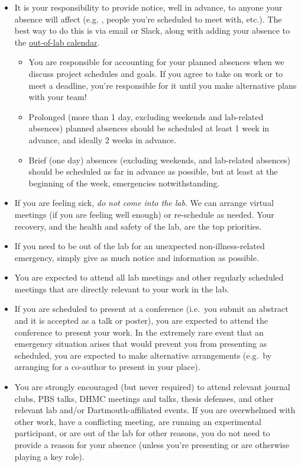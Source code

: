 \documentclass{tufte-book} %
\begin{document}
\begin{itemize}
\item It is your responsibility to provide notice, well in advance, to
  anyone your absence will affect (e.g. \director, people you're
  scheduled to meet with, etc.).  The best way to do this is via email
  or Slack, along with adding your absence to the
  \hyperref[sec: scheduling]{out-of-lab calendar}.
\begin{itemize}
\item You are responsible for accounting for your planned absences
  when we discuss project schedules and goals.  If you agree to take
  on work or to meet a deadline, you're responsible for it until you
  make alternative plans with your team!
\item Prolonged (more than 1 day, excluding weekends and
  lab-related absences) planned
  absences should be scheduled at least 1 week in advance, and ideally
  2 weeks in advance.
\item Brief (one day) absences (excluding weekends, and lab-related
  absences) should be scheduled as far in advance as possible, but at
  least at the beginning of the week, emergencies notwithstanding.
\end{itemize}

\item If you are feeling sick, \textit{do not come into the lab}.  We
  can arrange virtual meetings (if you are feeling well enough) or
  re-schedule as needed.  Your recovery, and the health and safety of
  the lab, are the top priorities.

\item If you need to be out of the lab for an unexpected
  non-illness-related emergency, simply give as much notice and
  information as possible.

\item You are expected to attend all lab meetings and other regularly
  scheduled meetings that are directly relevant to your work in the
  lab.

\item If you are scheduled to present at a conference (i.e.\ you
  submit an abstract and it is accepted as a talk or poster), you are
  expected to attend the conference to present your work.  In the
  extremely rare event that an emergency situation arises that would
  prevent you from presenting as scheduled, you are expected to make
  alternative arrangements (e.g.\ by arranging for a co-author to
  present in your place).

\item You are strongly encouraged (but never required) to attend
  relevant journal clubs, PBS talks, DHMC meetings and talks, thesis
  defenses, and other relevant lab and/or Dartmouth-affiliated events.
  If you are overwhelmed with other work, have a conflicting meeting,
  are running an experimental participant, or are out of the lab for
  other reasons, you do not need to provide a reason for your absence
  (unless you're presenting or are otherwise playing a key role).
\end{itemize}
\end{document}
